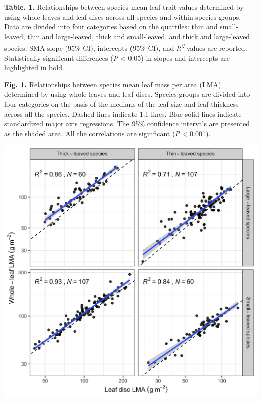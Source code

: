 \documentclass[
  12pt,
  a4paper,
,tablecaptionabove
]{scrartcl}
\providecommand{\DIFaddtex}[1]{{\protect\color{blue}\uwave{#1}}} %
\providecommand{\DIFdeltex}[1]{{\protect\color{red}\sout{#1}}}                      %
\providecommand{\DIFaddbegin}{} %
\providecommand{\DIFaddend}{} %
\providecommand{\DIFdelbegin}{} %
\providecommand{\DIFdelend}{} %
\providecommand{\DIFadd}[1]{\texorpdfstring{\DIFaddtex{#1}}{#1}} %
\providecommand{\DIFdel}[1]{\texorpdfstring{\DIFdeltex{#1}}{}} %
\newcommand{\DIFscaledelfig}{0.5}
\newlength{\DIFdelgraphicswidth} %
\newlength{\DIFdelgraphicsheight} %
\newcommand{\DIFaddincludegraphics}[2][]{{\color{blue}\fbox{\DIFOincludegraphics[#1]{#2}}}} %
\newcommand{\DIFdelincludegraphics}[2][]{%
\sbox{\DIFdelgraphicsbox}{\DIFOincludegraphics[#1]{#2}}%
\settoboxwidth{\DIFdelgraphicswidth}{\DIFdelgraphicsbox} %
\settoboxtotalheight{\DIFdelgraphicsheight}{\DIFdelgraphicsbox} %
\scalebox{\DIFscaledelfig}{%
\parbox[b]{\DIFdelgraphicswidth}{\usebox{\DIFdelgraphicsbox}\\[-\baselineskip] \rule{\DIFdelgraphicswidth}{0em}}\llap{\resizebox{\DIFdelgraphicswidth}{\DIFdelgraphicsheight}{%
\setlength{\unitlength}{\DIFdelgraphicswidth}%
\begin{picture}(1,1)%
\thicklines\linethickness{2pt} %
{\color[rgb]{1,0,0}\put(0,0){\framebox(1,1){}}}%
{\color[rgb]{1,0,0}\put(0,0){\line( 1,1){1}}}%
{\color[rgb]{1,0,0}\put(0,1){\line(1,-1){1}}}%
\end{picture}%
}\hspace*{3pt}}} %
} %
\DeclareRobustCommand{\DIFaddbegin}{\DIFOaddbegin \let\includegraphics\DIFaddincludegraphics} %
\DeclareRobustCommand{\DIFaddend}{\DIFOaddend \let\includegraphics\DIFOincludegraphics} %
\DeclareRobustCommand{\DIFdelbegin}{\DIFOdelbegin \let\includegraphics\DIFdelincludegraphics} %
\DeclareRobustCommand{\DIFdelend}{\DIFOaddend \let\includegraphics\DIFOincludegraphics} %
\begin{document}
\textbf{Table. 1.} Relationships between species mean leaf \DIFdelbegin \DIFdel{trait }\DIFdelend \DIFaddbegin \DIFadd{leaf mass per
area (LMA) }\DIFaddend values determined by using whole leaves and leaf discs across
all species and within species groups. Data are divided into four
categories based on the quartiles: thin and small-leaved, thin and
large-leaved, thick and small-leaved, and thick and large-leaved
species. SMA slope (95\% CI), intercepts (95\% CI), and
\emph{R\textsuperscript{2}} values are reported. Statistically
significant differences (\emph{P} \textless{} 0.05) in slopes and
intercepts are highlighted in bold.

\newpage

\textbf{Fig. 1.} Relationships between species mean leaf mass per area
(LMA) determined by using whole leaves and leaf discs. Species groups
are divided into four categories on the basis of the medians of the leaf
size and leaf thickness across all the species. Dashed lines indicate
1:1 lines. Blue solid lines indicate standardized major axis
regressions. The 95\% confidence intervals are presented as the shaded
area. All the correlations are significant (\emph{P} \textless{} 0.001).

\includegraphics{../figs/LMA_sp_gr.png}

\newpage
\end{document}
